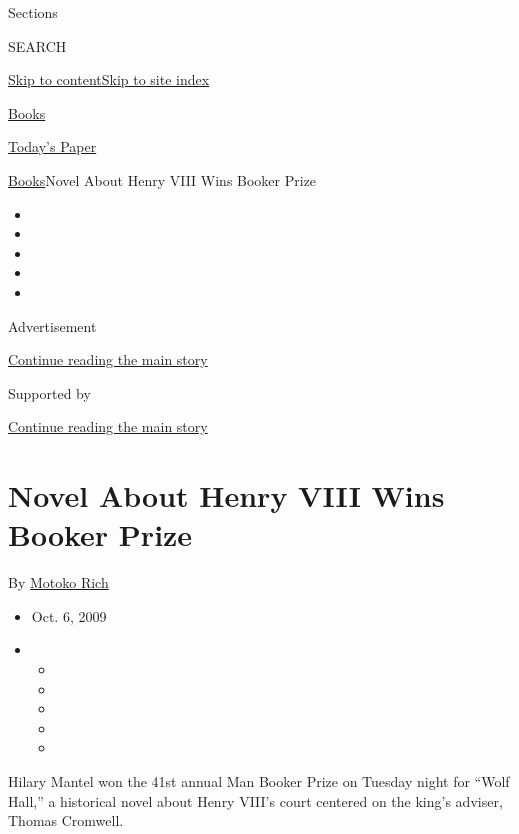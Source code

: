 Sections

SEARCH

\protect\hyperlink{site-content}{Skip to
content}\protect\hyperlink{site-index}{Skip to site index}

\href{https://www.nytimes3xbfgragh.onion/section/books}{Books}

\href{https://myaccount.nytimes3xbfgragh.onion/auth/login?response_type=cookie\&client_id=vi}{}

\href{https://www.nytimes3xbfgragh.onion/section/todayspaper}{Today's
Paper}

\href{/section/books}{Books}\textbar{}Novel About Henry VIII Wins Booker
Prize

\begin{itemize}
\item
\item
\item
\item
\item
\end{itemize}

Advertisement

\protect\hyperlink{after-top}{Continue reading the main story}

Supported by

\protect\hyperlink{after-sponsor}{Continue reading the main story}

\hypertarget{novel-about-henry-viii-wins-booker-prize}{%
\section{Novel About Henry VIII Wins Booker
Prize}\label{novel-about-henry-viii-wins-booker-prize}}

By \href{https://www.nytimes3xbfgragh.onion/by/motoko-rich}{Motoko Rich}

\begin{itemize}
\item
  Oct. 6, 2009
\item
  \begin{itemize}
  \item
  \item
  \item
  \item
  \item
  \end{itemize}
\end{itemize}

Hilary Mantel won the 41st annual Man Booker Prize on Tuesday night for
``Wolf Hall,'' a historical novel about Henry VIII's court centered on
the king's adviser, Thomas Cromwell.

